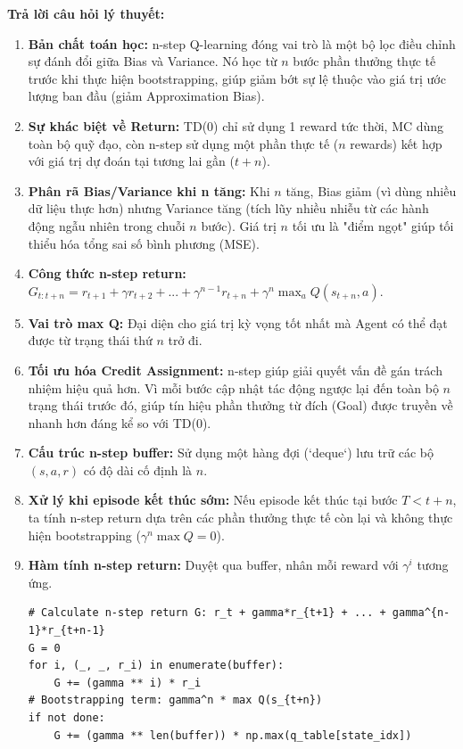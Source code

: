 \textbf{Trả lời câu hỏi lý thuyết:}
\begin{enumerate}
    \item \textbf{Bản chất toán học:} n-step Q-learning đóng vai trò là một bộ lọc điều chỉnh sự đánh đổi giữa Bias và Variance. Nó học từ $n$ bước phần thưởng thực tế trước khi thực hiện bootstrapping, giúp giảm bớt sự lệ thuộc vào giá trị ước lượng ban đầu (giảm Approximation Bias).
    \item \textbf{Sự khác biệt về Return:} TD(0) chỉ sử dụng 1 reward tức thời, MC dùng toàn bộ quỹ đạo, còn n-step sử dụng một phần thực tế ($n$ rewards) kết hợp với giá trị dự đoán tại tương lai gần ($t+n$).
    \item \textbf{Phân rã Bias/Variance khi n tăng:} Khi $n$ tăng, Bias giảm (vì dùng nhiều dữ liệu thực hơn) nhưng Variance tăng (tích lũy nhiều nhiễu từ các hành động ngẫu nhiên trong chuỗi $n$ bước). Giá trị $n$ tối ưu là "điểm ngọt" giúp tối thiểu hóa tổng sai số bình phương (MSE).
    \item \textbf{Công thức n-step return:} $G_{t:t+n} = r_{t+1} + \gamma r_{t+2} + ... + \gamma^{n-1} r_{t+n} + \gamma^n \max_{a} Q(s_{t+n}, a)$.
    \item \textbf{Vai trò max Q:} Đại diện cho giá trị kỳ vọng tốt nhất mà Agent có thể đạt được từ trạng thái thứ $n$ trở đi.
    \item \textbf{Tối ưu hóa Credit Assignment:} n-step giúp giải quyết vấn đề gán trách nhiệm hiệu quả hơn. Vì mỗi bước cập nhật tác động ngược lại đến toàn bộ $n$ trạng thái trước đó, giúp tín hiệu phần thưởng từ đích (Goal) được truyền về nhanh hơn đáng kể so với TD(0).
    \item \textbf{Cấu trúc n-step buffer:} Sử dụng một hàng đợi (`deque`) lưu trữ các bộ $(s, a, r)$ có độ dài cố định là $n$.
    \item \textbf{Xử lý khi episode kết thúc sớm:} Nếu episode kết thúc tại bước $T < t+n$, ta tính n-step return dựa trên các phần thưởng thực tế còn lại và không thực hiện bootstrapping ($\gamma^n \max Q = 0$).
    \item \textbf{Hàm tính n-step return:} Duyệt qua buffer, nhân mỗi reward với $\gamma^i$ tương ứng.
    \begin{lstlisting}[style=PythonStyle, caption={n-step Return Calculation}]
# Calculate n-step return G: r_t + gamma*r_{t+1} + ... + gamma^{n-1}*r_{t+n-1}
G = 0
for i, (_, _, r_i) in enumerate(buffer):
    G += (gamma ** i) * r_i
# Bootstrapping term: gamma^n * max Q(s_{t+n})
if not done:
    G += (gamma ** len(buffer)) * np.max(q_table[state_idx])

\end{lstlisting}
\end{enumerate}
